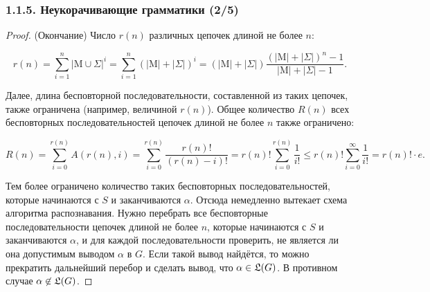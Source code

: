\begin{frame}
\frametitle{1.1.5. Неукорачивающие грамматики (2/5)}

\begin{proof} (Окончание)
Число $r(n)$  различных цепочек длиной не более
$n$:

\vspace{-12pt}
$$
r(n) = \sum_{i=1}^{n} \left|\mathrm{M}\cup \Sigma\right|^i
=\sum_{i=1}^n (|\mathrm{M}|+|\Sigma|)^i=
(|\mathrm{M}|+|\Sigma|)\frac{(|\mathrm{M}|+|\Sigma|)^n -1}{|\mathrm{M}|+|\Sigma| -1}.
$$

\vspace{-4pt}
Далее, длина бесповторной последовательности, составленной из
таких цепочек, также ограничена (например, величиной $r(n)$). Общее
количество $R(n)$ всех бесповторных последовательностей цепочек длиной не
более $n$ также ограничено:

\vspace{-16pt}
 $$R(n)=\sum_{i=0}^{r(n)} A(r(n),i) =
 \sum_{i=0}^{r(n)} \frac{r(n)!}{(r(n)-i)!}=
  r(n)!\sum_{i=0}^{r(n)}\frac{1}{i!}
  \leq r(n)!\sum_{i=0}^\infty\frac{1}{i!}
  =r(n)!\cdot e.$$ 

\vspace{-4pt}
Тем
более ограничено количество таких бесповторных
последовательностей, которые начинаются с $S$ и заканчиваются
$\alpha$.
Отсюда немедленно вытекает схема алгоритма распознавания. Нужно
перебрать все бесповторные последовательности цепочек длиной не
более $n$, которые начинаются с $S$ и заканчиваются $\alpha$, и для
каждой последовательности проверить, не является ли она допустимым
выводом $\alpha$ в $G$. 
Если такой вывод найдётся, то можно прекратить
дальнейший перебор и сделать вывод, что $\alpha\in \frak{L}(G)$. В
противном случае $\alpha\not\in \frak{L}(G)$.
\end{proof}
\end{frame}

